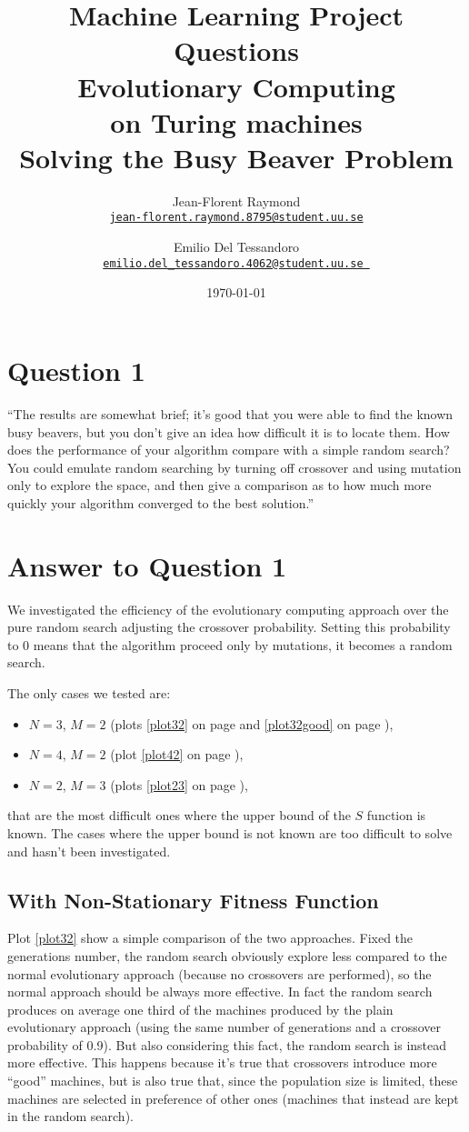 \documentclass{report}
\title{Machine Learning Project Questions\\\textbf{Evolutionary Computing\\on Turing machines}\\{\Large Solving the Busy Beaver Problem}}
\author{Jean-Florent Raymond\\\href{mailto:jean-florent.raymond.8795@student.uu.se}{\texttt{jean-florent.raymond.8795@student.uu.se}} \and Emilio Del Tessandoro\\
  \href{mailto:emilio.del_tessandoro.4062@student.uu.se }{\texttt{emilio.del\_tessandoro.4062@student.uu.se }}}
\date{\today}
\begin{document}
\maketitle

\section*{Question 1}

``The results are somewhat brief; it's good that you were able to find
    the known busy beavers, but you don't give an idea how difficult it
    is to locate them. How does the performance of your algorithm
    compare with a simple random search? You could emulate random
    searching by turning off crossover and using mutation only to
    explore the space, and then give a comparison as to how much more
    quickly your algorithm converged to the best solution.''

\section*{Answer to Question 1} We investigated the efficiency of the evolutionary computing approach over the pure random search adjusting the crossover probability. Setting this probability to 0 means that the algorithm proceed only by mutations, \ie it becomes a random search.

The only cases we tested are:
\begin{itemize}
\item $N = 3$, $M = 2$ (plots \ref{plot32} on page \pageref{plot32} and \ref{plot32good} on page \pageref{plot32good}),
\item $N = 4$, $M = 2$ (plot \ref{plot42} on page \pageref{plot42}),
\item $N = 2$, $M = 3$ (plots \ref{plot23} on page \pageref{plot23}),
\end{itemize}

that are the most difficult ones where the upper bound of the $S$ function is known. The cases where the upper bound is not known are too difficult to solve and hasn't been investigated.


\subsection*{With Non-Stationary Fitness Function}
Plot \ref{plot32} show a simple comparison of the two approaches. %
Fixed the generations number, the random search obviously explore less compared to the normal evolutionary approach (because no crossovers are performed), so the normal approach should be always more effective. In fact the random search produces on average one third of the machines produced by the plain evolutionary approach (using the same number of generations and a crossover probability of 0.9).
But also considering this fact, the random search is instead more effective.
This happens because it's true that crossovers introduce more ``good'' machines, but is also true that, since the population size is limited, these machines are selected in preference of other ones (machines that instead are kept in the random search).
\end{document}
